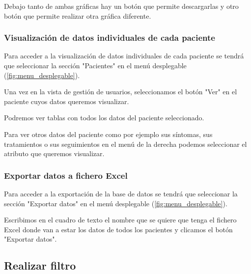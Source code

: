 Debajo tanto de ambas gráficas hay un botón que permite descargarlas y otro botón que permite realizar otra gráfica diferente.


\subsubsection{Visualización de datos individuales de cada paciente}

Para acceder a la visualización de datos individuales de cada paciente se tendrá que seleccionar la sección "Pacientes"{} en el menú desplegable (\ref{fig:menu_desplegable}).


Una vez en la vista de gestión de usuarios, seleccionamos el botón "Ver"{} en el paciente cuyos datos queremos visualizar.


Podremos ver tablas con todos los datos del paciente seleccionado.


Para ver otros datos del paciente como por ejemplo sus síntomas, sus tratamientos o sus seguimientos en el menú de la derecha podemos seleccionar el atributo que queremos visualizar.


\subsubsection{Exportar datos a fichero Excel}

Para acceder a la exportación de la base de datos se tendrá que seleccionar la sección "{}Exportar datos"{} en el menú desplegable (\ref{fig:menu_desplegable}).


Escribimos en el cuadro de texto el nombre que se quiere que tenga el fichero Excel donde van a estar los datos de todos los pacientes y clicamos el botón "{}Exportar datos".


\subsection{Realizar filtro}

